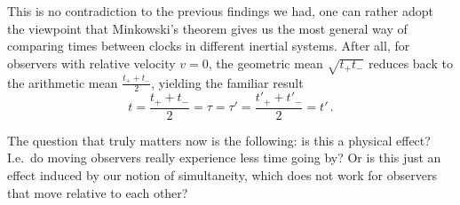 \documentclass[../relativity_main.tex]{subfiles}
\begin{document}
This is no contradiction to the previous findings we had, one can rather adopt the viewpoint that Minkowski's theorem gives us the most general way of comparing times between clocks in different inertial systems. After all, for observers with relative velocity $v = 0$, the geometric mean $\sqrt{t_+ t_-}$ reduces back to the arithmetic mean $\frac{t_+ + t_-}{2}$, yielding the familiar result
\begin{equation}
	t = \frac{t_+ + t_-}{2} = \tau = \tau' = \frac{t'_+ + t'_-}{2} = t' \, .
\end{equation}

The question that truly matters now is the following: is this a physical effect? I.e.~do moving observers really experience less time going by? Or is this just an effect induced by our notion of simultaneity, which does not work for observers that move relative to each other?



\end{document}
